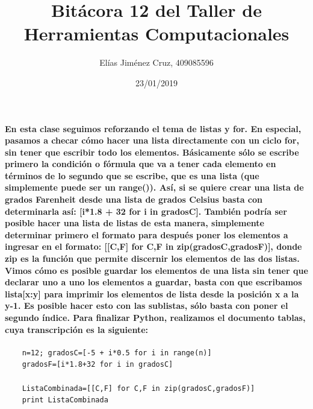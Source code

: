 \documentclass[letterpaper, 12pt, oneside]{article} %
\title{\Huge Bitácora 12 del Taller de Herramientas Computacionales}
\author{Elías Jiménez Cruz, 409085596}
\date{23/01/2019}
\begin{document}
	\maketitle
	\paragraph{En esta clase seguimos reforzando el tema de listas y for. En especial, pasamos a checar cómo hacer una lista directamente con un ciclo for, sin tener que escribir todo los elementos. Básicamente sólo se escribe primero la condición o fórmula que va a tener cada elemento en términos de lo segundo que se escribe, que es una lista (que simplemente puede ser un range()). Así, si se quiere crear una lista de grados Farenheit desde una lista de grados Celsius basta con determinarla así: [i*1.8 + 32 for i in gradosC]. También podría ser posible hacer una lista de listas de esta manera, simplemente determinar primero el formato para después poner los elementos a ingresar en el formato: [[C,F] for C,F in zip(gradosC,gradosF)], donde zip es la función que permite discernir los elementos de las dos listas. Vimos cómo es posible guardar los elementos de una lista sin tener que declarar uno a uno los elementos a guardar, basta con que escribamos lista[x:y] para imprimir los elementos de lista desde la posición x a la y-1. Es posible hacer esto con las sublistas, sólo basta con poner el segundo índice. Para finalizar Python, realizamos el documento tablas, cuya transcripción es la siguiente:}
	\begin{verbatim}
	n=12; gradosC=[-5 + i*0.5 for i in range(n)]
	gradosF=[i*1.8+32 for i in gradosC]
	
	ListaCombinada=[[C,F] for C,F in zip(gradosC,gradosF)]
	print ListaCombinada
	\end{verbatim}
\end{document}
